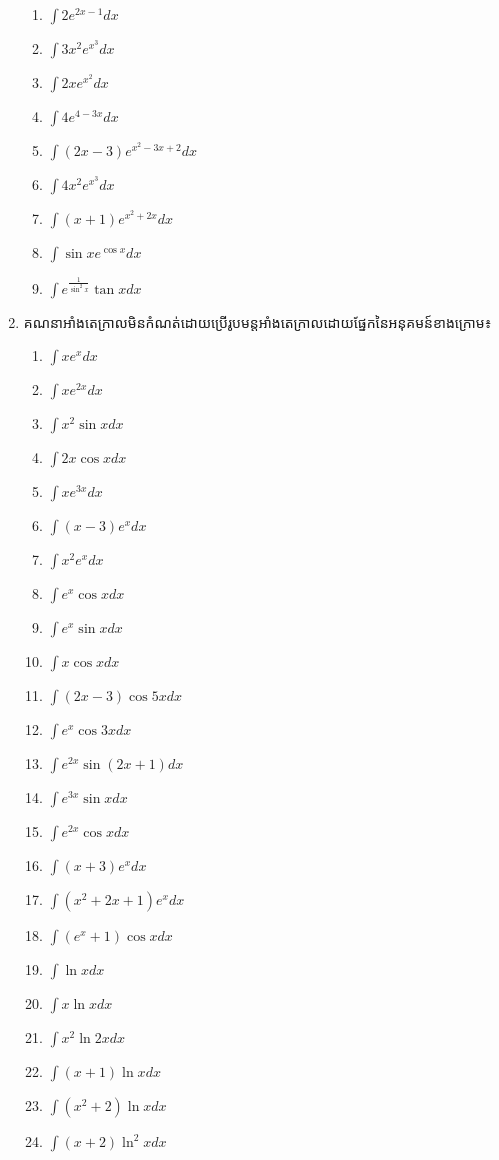 \documentclass[12pt, a4paper]{article}
\begin{document}
\begin{enumerate}[m]
	\begin{enumerate}[k, 3]
		\item $\int 2e^{2x-1} dx$
		\item $\int 3x^2e^{x^3} dx$
		\item $\int 2xe^{x^2} dx$
		\item $\int 4e^{4-3x} dx$
		\item $\int (2x-3)e^{x^2-3x+2}dx$
		\item $\int 4x^2e^{x^3} dx$
		\item $\int (x+1)e^{x^2+2x} dx$
		\item $\int \sin xe^{\cos x} dx$
		\item $\int e^{\frac{1}{\sin^2x}} \tan xdx$
	\end{enumerate}
	\item គណនាអាំងតេក្រាលមិនកំណត់ដោយប្រើរូបមន្តអាំងតេក្រាលដោយផ្នែកនៃអនុគមន៍ខាងក្រោម៖
	\begin{enumerate}[k, 4]
		\item $\int xe^x dx$
		\item $\int xe^{2x} dx$
		\item $\int x^2\sin x dx$
		\item $\int 2x\cos x dx$
		\item $\int xe^{3x} dx$
		\item $\int (x-3)e^x dx$
		\item $\int x^2e^x dx$
		\item $\int e^x\cos x dx$
		\item $\int e^x \sin x dx$
		\item $\int x\cos x dx$
		\item $\int (2x-3)\cos5x dx$
		\item $\int e^x\cos3x dx$
		\item $\int e^{2x}\sin(2x+1) dx$
		\item $\int e^{3x}\sin x dx$
		\item $\int e^{2x}\cos x dx$
		\item $\int (x+3)e^x dx$
		\item $\int (x^2+2x+1)e^x dx$
		\item $\int (e^x+1)\cos x dx$
		\item $\int \ln x dx$
		\item $\int x\ln x dx$
		\item $\int x^2 \ln2x  dx$
		\item $\int (x+1)\ln x dx$
		\item $\int (x^2+2)\ln x dx$
		\item $\int (x+2)\ln^2x dx$ 

\end{enumerate}
\end{enumerate}
\end{document}

